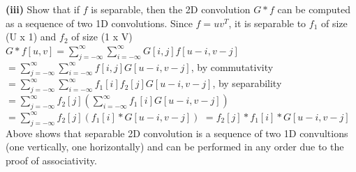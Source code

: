 \documentclass[12pt,twoside]{article}
\newcommand{\tabUnit}{3ex}
\newcommand{\tabT}{\hspace*{\tabUnit}}
\begin{document}
\textbf{(iii)} Show that if $f$ is separable, then the 2D convolution $G \ast f$ can be computed as a sequence of two 1D convolutions. \newline
\newline
\tabT\tabT\tabT\tabT\tabT\tabT
Since $f=uv^{T}$, it is separable to $f_{1}$ of size (U x 1) and $f_{2}$ of size (1 x V) \newline
\tabT\tabT\tabT\tabT\tabT\tabT
$G \ast f[u,v] = \sum_{j=-\infty}^{\infty} \sum_{i=-\infty}^{\infty} G[i,j]f[u-i,v-j]$ \newline
\tabT\tabT\tabT\tabT\tabT\tabT\tabT\tabT\tabT
$= \sum_{j=-\infty}^{\infty} \sum_{i=-\infty}^{\infty} f[i,j]G[u-i,v-j]$, by commutativity \newline
\tabT\tabT\tabT\tabT\tabT\tabT\tabT\tabT\tabT
$= \sum_{j=-\infty}^{\infty} \sum_{i=-\infty}^{\infty} f_{1}[i]f_{2}[j]G[u-i,v-j]$, by separability \newline
\tabT\tabT\tabT\tabT\tabT\tabT\tabT\tabT\tabT
$= \sum_{j=-\infty}^{\infty} f_{2}[j] (\sum_{i=-\infty}^{\infty} f_{1}[i]G[u-i,v-j])$ \newline
\tabT\tabT\tabT\tabT\tabT\tabT\tabT\tabT\tabT
$= \sum_{j=-\infty}^{\infty} f_{2}[j] (f_{1}[i] \ast G[u-i,v-j])$ \newline
\tabT\tabT\tabT\tabT\tabT\tabT\tabT\tabT\tabT
$= f_{2}[j] \ast f_{1}[i] \ast G[u-i,v-j]$ \newline
\newline
Above shows that separable 2D convolution is a sequence of two 1D convultions (one vertically, one horizontally) and can be performed in any order due to the proof of associativity.
\newline
\newline
\end{document}
